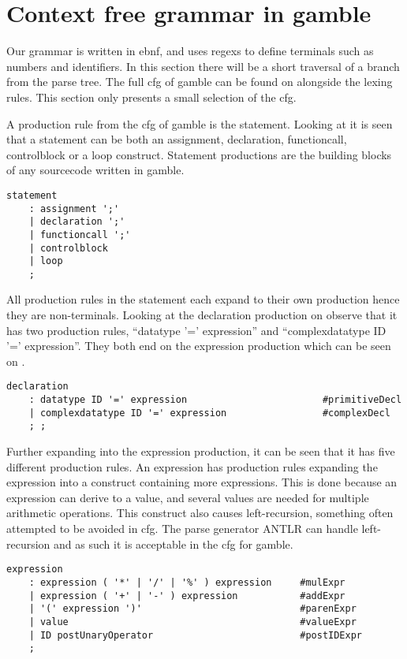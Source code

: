 \section{Context free grammar in gamble}
Our grammar is written in \acrfull{ebnf}, and uses \acrfull{regex}s to define terminals such as numbers and identifiers.
In this section there will be a short traversal of a branch from the parse tree.
The full \acrshort{cfg} of \gls{gamble} can be found on  alongside the lexing rules.
This section only presents a small selection of the \acrshort{cfg}.

A production rule from the \acrshort{cfg} of \gls{gamble} is the statement. 
Looking at  it is seen that a statement can be both an assignment, declaration, functioncall, controlblock or a loop construct. 
Statement productions are the building blocks of any sourcecode written in \gls{gamble}.

\begin{lstlisting}[caption={\acrshort{cfg} Statement},frame=tlrb,label={lst:statements},numbers=none]
statement
    : assignment ';'
    | declaration ';'
    | functioncall ';'
    | controlblock
    | loop
    ;
\end{lstlisting}

All production rules in the statement each expand to their own production hence they are non-terminals.
Looking at the declaration production on  observe that it has two production rules, ``datatype '=' expression'' and ``complexdatatype ID '=' expression''. 
They both end on the expression production which can be seen on .

\begin{lstlisting}[caption={\acrshort{cfg} Declaration},frame=tlrb,label={lst:declaration},numbers=none]
declaration
    : datatype ID '=' expression                        #primitiveDecl
    | complexdatatype ID '=' expression                 #complexDecl
    ; ;
\end{lstlisting}

Further expanding into the expression production, it can be seen that it has five different production rules.
An expression has production rules expanding the expression into a construct containing more expressions.
This is done because an expression can derive to a value, and several values are needed for multiple arithmetic operations.
This construct also causes left-recursion, something often attempted to be avoided in \acrshort{cfg}.
The parse generator ANTLR can handle left-recursion and as such it is acceptable in the \acrshort{cfg} for \gls{gamble}.
\begin{lstlisting}[caption={\acrshort{cfg} Expression},frame=tlrb,label={lst:expression},numbers=none]
expression
    : expression ( '*' | '/' | '%' ) expression     #mulExpr
    | expression ( '+' | '-' ) expression           #addExpr
    | '(' expression ')'                            #parenExpr
    | value                                         #valueExpr
    | ID postUnaryOperator                          #postIDExpr
    ;
\end{lstlisting}
  
